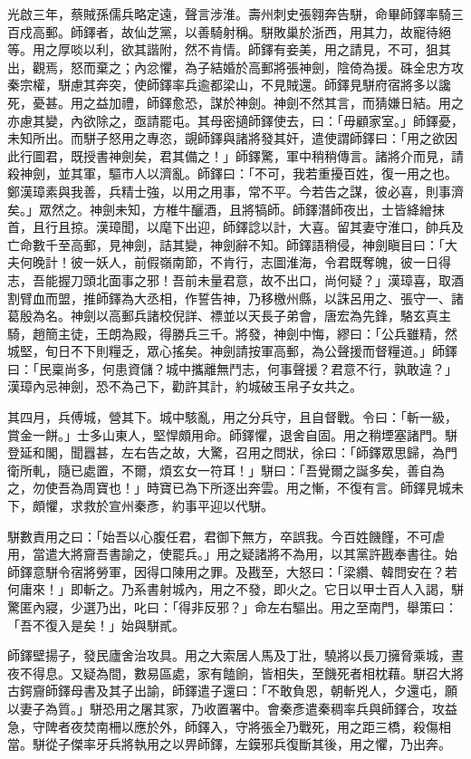 \begin{pinyinscope}
 光啟三年，蔡賊孫儒兵略定遠，聲言涉淮。壽州刺史張翱奔告駢，命畢師鐸率騎三百戍高郵。師鐸者，故仙芝黨，以善騎射稱。駢敗巢於浙西，用其力，故寵待絕等。用之厚啖以利，欲其諧附，然不肯情。師鐸有妾美，用之請見，不可，狙其出，觀焉，怒而棄之；內忿懼，為子結婚於高郵將張神劍，陰倚為援。硃全忠方攻秦宗權，駢慮其奔突，使師鐸率兵逾都梁山，不見賊還。師鐸見駢府宿將多以讒死，憂甚。用之益加禮，師鐸愈恐，謀於神劍。神劍不然其言，而猜嫌日結。用之亦慮其變，內欲除之，亟請罷屯。其母密擿師鐸使去，曰：「毋顧家室。」師鐸憂，未知所出。而駢子怒用之專恣，覬師鐸與諸將發其奸，遣使謂師鐸曰：「用之欲因此行圖君，既授書神劍矣，君其備之！」師鐸驚，軍中稍稍傳言。諸將介而見，請殺神劍，並其軍，驅市人以濟亂。師鐸曰：「不可，我若重擾百姓，復一用之也。鄭漢璋素與我善，兵精士強，以用之用事，常不平。今若告之謀，彼必喜，則事濟矣。」眾然之。神劍未知，方椎牛釃酒，且將犒師。師鐸潛師夜出，士皆絳繒抹首，且行且掠。漢璋聞，以麾下出迎，師鐸諗以計，大喜。留其妻守淮口，帥兵及亡命數千至高郵，見神劍，詰其變，神劍辭不知。師鐸語稍侵，神劍瞋目曰：「大夫何晚計！彼一妖人，前假嶺南節，不肯行，志圖淮海，令君既奪魄，彼一日得志，吾能握刀頭北面事之邪！吾前未量君意，故不出口，尚何疑？」漢璋喜，取酒割臂血而盟，推師鐸為大丞相，作誓告神，乃移檄州縣，以誅呂用之、張守一、諸葛殷為名。神劍以高郵兵諸校倪詳、褾並以天長子弟會，唐宏為先鋒，駱玄真主騎，趙簡主徒，王朗為殿，得勝兵三千。將發，神劍中悔，繆曰：「公兵雖精，然城堅，旬日不下則糧乏，眾心搖矣。神劍請按軍高郵，為公聲援而督糧道。」師鐸曰：「民稟尚多，何患資儲？城中攜離無鬥志，何事聲援？君意不行，孰敢違？」漢璋內忌神劍，恐不為己下，勸許其計，約城破玉帛子女共之。



 其四月，兵傅城，營其下。城中駭亂，用之分兵守，且自督戰。令曰：「斬一級，賞金一餅。」士多山東人，堅悍頗用命。師鐸懼，退舍自固。用之稍堙塞諸門。駢登延和閣，聞囂甚，左右告之故，大驚，召用之問狀，徐曰：「師鐸眾思歸，為門衛所軋，隨已處置，不爾，煩玄女一符耳！」駢曰：「吾覺爾之誕多矣，善自為之，勿使吾為周寶也！」時寶已為下所逐出奔雲。用之慚，不復有言。師鐸見城未下，頗懼，求救於宣州秦彥，約事平迎以代駢。



 駢數責用之曰：「始吾以心腹任君，君御下無方，卒誤我。今百姓饑饉，不可虐用，當遣大將齎吾書諭之，使罷兵。」用之疑諸將不為用，以其黨許戡奉書往。始師鐸意駢令宿將勞軍，因得口陳用之罪。及戡至，大怒曰：「梁纘、韓問安在？若何庸來！」即斬之。乃系書射城內，用之不發，即火之。它日以甲士百人入謁，駢驚匿內寢，少選乃出，叱曰：「得非反邪？」命左右驅出。用之至南門，舉策曰：「吾不復入是矣！」始與駢貳。



 師鐸壁揚子，發民廬舍治攻具。用之大索居人馬及丁壯，驍將以長刀擁脅乘城，晝夜不得息。又疑為間，數易區處，家有饁餉，皆相失，至饑死者相枕藉。駢召大將古鍔齎師鐸母書及其子出諭，師鐸遣子還曰：「不敢負恩，朝斬兇人，夕還屯，願以妻子為質。」駢恐用之屠其家，乃收置署中。會秦彥遣秦稠率兵與師鐸合，攻益急，守陴者夜焚南柵以應於外，師鐸入，守將張全乃戰死，用之距三橋，殺傷相當。駢從子傑率牙兵將執用之以畀師鐸，左鏌邪兵復斷其後，用之懼，乃出奔。




\end{pinyinscope}
